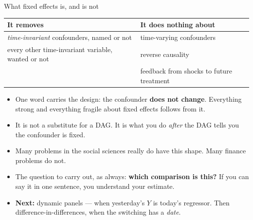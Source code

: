 \documentclass[
  11pt,
  ignorenonframetext,
  aspectratio=169,
]{beamer}
\providecommand{\tightlist}{%
  \setlength{\itemsep}{0pt}\setlength{\parskip}{0pt}}
\begin{document}
\begin{frame}{What fixed effects is, and is not}
\protect{}\label{what-fixed-effects-is-and-is-not}
\begin{center}\scriptsize
\begin{tabular}{ll}
\toprule
It removes & It does nothing about \\
\midrule
\emph{time-invariant} confounders, named or not & time-varying confounders \\
every other time-invariant variable, wanted or not & reverse causality \\
 & feedback from shocks to future treatment \\
\bottomrule
\end{tabular}
\end{center}

\begin{itemize}
\tightlist
\item
  One word carries the design: the confounder \textbf{does not change}.
  Everything strong and everything fragile about fixed effects follows
  from it.
\item
  It is not a substitute for a DAG. It is what you do \emph{after} the
  DAG tells you the confounder is fixed.
\item
  Many problems in the social sciences really do have this shape. Many
  finance problems do not.
\end{itemize}

\vspace{0.2em}

\begin{itemize}
\tightlist
\item
  The question to carry out, as always: \textbf{which comparison is
  this?} If you can say it in one sentence, you understand your
  estimate.
\item
  \textbf{Next:} dynamic panels --- when yesterday's \(Y\) is today's
  regressor. Then difference-in-differences, when the switching has a
  \emph{date}.
\end{itemize}
\end{frame}
\end{document}
